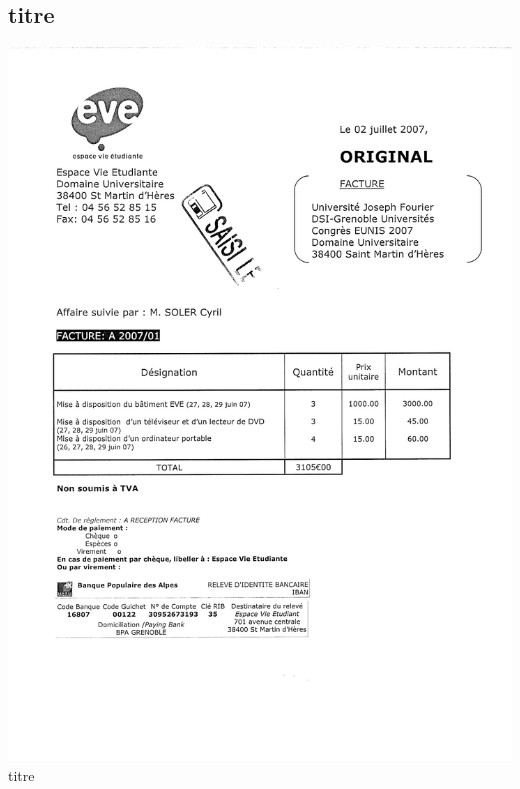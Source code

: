\subsection{titre}
\begin{center}
\includegraphics[scale=0.6]{annexes/images/facture_client_mise_a_disposition.pdf} \\
titre
\end{center}
